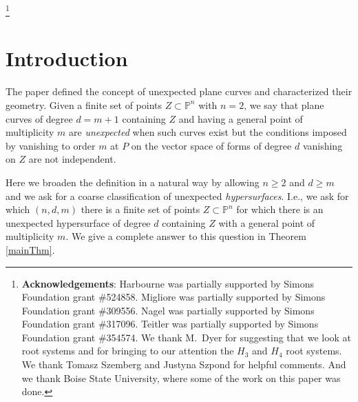 \documentclass[12pt]{amsart}
\numberwithin{equation}{section}
\theoremstyle{definition}
\newcommand{\PP}{ \ensuremath{\mathbb{P}}}
\begin{document}
\date{December 19, 2018}

\thanks{
{\bf Acknowledgements}: Harbourne was partially supported by Simons Foundation grant \#524858.
Migliore was partially supported by Simons Foundation grant \#309556.
Nagel was partially supported by Simons Foundation grant \#317096.
Teitler was partially supported by Simons Foundation grant \#354574.
We thank M.\ Dyer for suggesting that we look at root systems and for 
bringing to our attention the $H_3$ and $H_4$ root systems. We thank Tomasz Szemberg and Justyna Szpond for 
helpful comments. 
And we thank Boise State University, where some of the work
on this paper was done.}



\maketitle



\section{Introduction}

The paper \cite{CHMN} defined the concept of unexpected plane curves and characterized their geometry.
Given a finite set of points $Z\subset\PP^n$ with $n=2$, we say that plane curves of degree $d=m+1$ 
containing $Z$ and having a general point of multiplicity $m$ are {\it unexpected} when such curves exist
but the conditions imposed by vanishing to order $m$ at $P$ on the vector space of forms of degree $d$ 
vanishing on $Z$ are not independent.

Here we broaden the definition in a natural way by allowing $n\geq2$ and $d\geq m$ and we ask
for a coarse classification of unexpected {\it hypersurfaces}. I.e., we ask for which
$(n,d,m)$ there is a finite set of points $Z\subset \PP^n$ for which there is an unexpected hypersurface
of degree $d$ containing $Z$ with a general point of multiplicity $m$. We give a complete
answer to this question in Theorem \ref{mainThm}.
\end{document}
